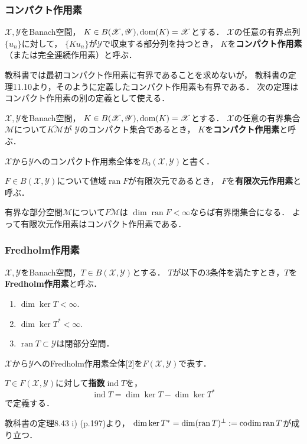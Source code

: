 \documentclass[a4j]{jsarticle}
\newcommand{\ran}{\operatorname{ran}}
\newcommand{\ind}{\operatorname{ind}}
\newcommand{\spX}{\mathscr{X}}
\newcommand{\spY}{\mathscr{Y}}
\newcommand{\spM}{\mathscr{M}}
\begin{document}
    \subsubsection{コンパクト作用素}
    \begin{Def}
        $\spX, \spY$をBanach空間，
        $K \in B(\spX, \spY), \dom(K)=\spX$とする．
        $\spX$の任意の有界点列$\{u_n\}$に対して，
        $\{Ku_n\}$が$\spY$で収束する部分列を持つとき，
        $K$を\textbf{コンパクト作用素}（または完全連続作用素）と呼ぶ．
    \end{Def}
    教科書では最初コンパクト作用素に有界であることを求めないが，
    教科書の定理11.10より，そのように定義したコンパクト作用素も有界である．
    次の定理はコンパクト作用素の別の定義として使える．
    \begin{Def}[定理11.9, p.257]
        $\spX, \spY$をBanach空間，
        $K \in B(\spX, \spY), \dom(K)=\spX$とする．
        $\spX$の任意の有界集合$\spM$について$\overline{K \spM}$が
        $\spY$のコンパクト集合であるとき，
        $K$を\textbf{コンパクト作用素}と呼ぶ．
    \end{Def}
    $\spX$から$\spY$へのコンパクト作用素全体を$B_0(\spX,\spY)$と書く．
    \begin{Def}
        $F \in B(\spX, \spY)$について値域$\ran F$が有限次元であるとき，
        $F$を\textbf{有限次元作用素}と呼ぶ．
    \end{Def}
    有界な部分空間$\spM$について$\overline{F \spM}$は
    $\dim \ran F<\infty$ならば有界閉集合になる．
    よって有限次元作用素はコンパクト作用素である．

    \subsubsection{Fredholm作用素}
    \begin{Def}
        $\spX, \spY$をBanach空間，$T \in B(\spX, \spY)$とする．
        $T$が以下の3条件を満たすとき，$T$を\textbf{Fredholm作用素}と呼ぶ．
        \begin{enumerate}
            \item $\dim \ker T < \infty$.
            \item $\dim \ker T^* < \infty$.
            \item $\ran{T} \subset \spY$は閉部分空間．
        \end{enumerate}
    \end{Def}
    $\spX$から$\spY$へのFredholm作用素全体[2]を$F(\spX,\spY)$で表す．
    \begin{Def}
        $T \in F(\spX,\spY)$に対して\textbf{指数}$\ind T$を，
        \[ \ind T=\dim \ker T-\dim \ker T^* \]
        で定義する．
    \end{Def}
    教科書の定理8.43 i) (p.197)より，
    $\dim \ker T^*=\dim (\ran T)^{\perp}:=\codim \ran T$が成り立つ．
\end{document}

